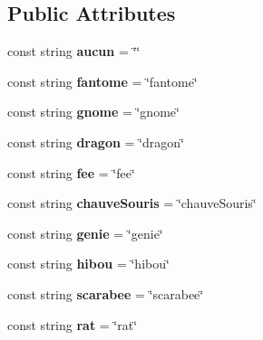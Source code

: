 \subsection*{Public Attributes}
\begin{DoxyCompactItemize}
\item 
\mbox{\label{class_card_a69a2c47876f971e6468843da4e08cb28}} 
const string {\bfseries aucun} = \char`\"{}\char`\"{}
\item 
\mbox{\label{class_card_a4660a0a9312b49d5d9320933caa02b50}} 
const string {\bfseries fantome} = \char`\"{}fantome\char`\"{}
\item 
\mbox{\label{class_card_a4f6b07b2a271a368b721eed56002e623}} 
const string {\bfseries gnome} = \char`\"{}gnome\char`\"{}
\item 
\mbox{\label{class_card_a3a7c407d2b40721bb136db5157cdfc99}} 
const string {\bfseries dragon} = \char`\"{}dragon\char`\"{}
\item 
\mbox{\label{class_card_acd38e8b841a6531896116c688b52b907}} 
const string {\bfseries fee} = \char`\"{}fee\char`\"{}
\item 
\mbox{\label{class_card_a4824bfe83f5f0c21215b7637d03d33c3}} 
const string {\bfseries chauve\+Souris} = \char`\"{}chauve\+Souris\char`\"{}
\item 
\mbox{\label{class_card_a63ad8587231502a9912d7ee5f62348dc}} 
const string {\bfseries genie} = \char`\"{}genie\char`\"{}
\item 
\mbox{\label{class_card_afd081c4b12e7249a760e0bafcc3ba4df}} 
const string {\bfseries hibou} = \char`\"{}hibou\char`\"{}
\item 
\mbox{\label{class_card_a9e48a7f745f925295c64517fa0b43f62}} 
const string {\bfseries scarabee} = \char`\"{}scarabee\char`\"{}
\item 
\mbox{\label{class_card_a7defcd2fa61f659efe558b817d8fb7e3}} 
const string {\bfseries rat} = \char`\"{}rat\char`\"{}
\item 
\mbox{\label{class_card_adb39123cdc9282947aa9df779be956c4}} 

\end{DoxyCompactItemize}
